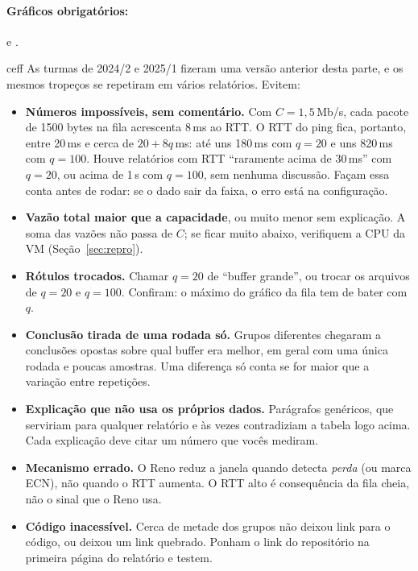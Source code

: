\documentclass[11pt,a4paper]{article}
\begin{document}
\paragraph{Gráficos obrigatórios:}  e .

\begin{caixa}[title=Erros comuns em semestres anteriores,breakable]{ceff}
As turmas de 2024/2 e 2025/1 fizeram uma versão anterior desta parte, e os mesmos
tropeços se repetiram em vários relatórios. Evitem:
\begin{itemize}
\item \textbf{Números impossíveis, sem comentário.} Com $C=1{,}5$\,Mb/s, cada pacote de
1500 bytes na fila acrescenta 8\,ms ao RTT. O RTT do ping fica, portanto, entre 20\,ms e
cerca de $20+8q$\,ms: até uns 180\,ms com $q=20$ e uns 820\,ms com $q=100$. Houve
relatórios com RTT “raramente acima de 30\,ms” com $q=20$, ou acima de 1\,s com
$q=100$, sem nenhuma discussão. Façam essa conta antes de rodar: se o dado sair da
faixa, o erro está na configuração.
\item \textbf{Vazão total maior que a capacidade}, ou muito menor sem explicação. A soma
das vazões não passa de $C$; se ficar muito abaixo, verifiquem a CPU da VM
(Seção~\ref{sec:repro}).
\item \textbf{Rótulos trocados.} Chamar $q=20$ de “buffer grande”, ou trocar os arquivos
de $q=20$ e $q=100$. Confiram: o máximo do gráfico da fila tem de bater com $q$.
\item \textbf{Conclusão tirada de uma rodada só.} Grupos diferentes chegaram a conclusões
opostas sobre qual buffer era melhor, em geral com uma única rodada e poucas amostras.
Uma diferença só conta se for maior que a variação entre repetições.
\item \textbf{Explicação que não usa os próprios dados.} Parágrafos genéricos, que
serviriam para qualquer relatório e às vezes contradiziam a tabela logo acima. Cada
explicação deve citar um número que vocês mediram.
\item \textbf{Mecanismo errado.} O Reno reduz a janela quando detecta \emph{perda} (ou
marca ECN), não quando o RTT aumenta. O RTT alto é consequência da fila cheia, não o
sinal que o Reno usa.
\item \textbf{Código inacessível.} Cerca de metade dos grupos não deixou link para o
código, ou deixou um link quebrado. Ponham o link do repositório na primeira página do
relatório e testem.
\end{itemize}
\end{caixa}
\end{document}
